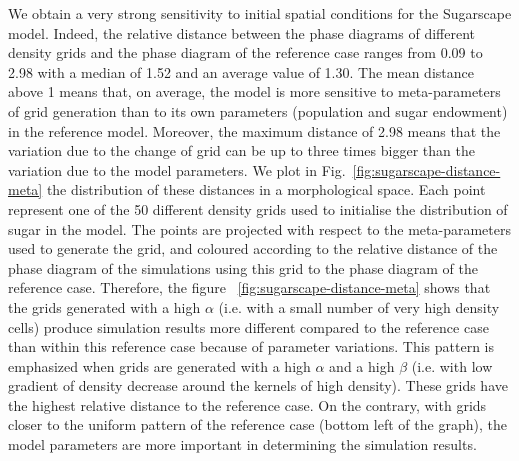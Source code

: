 \documentclass[3p,times,procedia]{elsarticle}
\begin{document}
We obtain a very strong sensitivity to initial spatial conditions for the Sugarscape model. Indeed, the relative distance between the phase diagrams of different density grids and the phase diagram of the reference case ranges from 0.09 to 2.98 with a median of 1.52 and an average value of 1.30. The mean distance above 1 means that, on average, the model is more sensitive to meta-parameters of grid generation than to its own parameters (population and sugar endowment) in the reference model. Moreover, the maximum distance of 2.98 means that the variation due to the change of grid can be up to three times bigger than the variation due to the model parameters. We plot in Fig.~\ref{fig:sugarscape-distance-meta} the distribution of these distances in a morphological space. Each point represent one of the 50 different density grids used to initialise the distribution of sugar in the model. The points are projected with respect to the meta-parameters used to generate the grid, and coloured according to the relative distance of the phase diagram of the simulations using this grid to the phase diagram of the reference case. Therefore, the figure ~\ref{fig:sugarscape-distance-meta} shows that the grids generated with a high $\alpha$ (i.e. with a small number of very high density cells) produce simulation results more different compared to the reference case than within this reference case because of parameter variations. This pattern is emphasized when grids are generated with a high $\alpha$ and a high $\beta$ (i.e. with low gradient of density decrease around the kernels of high density). These grids have the highest relative distance to the reference case. On the contrary, with grids closer to the uniform pattern of the reference case (bottom left of the graph), the model parameters are more important in determining the simulation results. 
\end{document}
